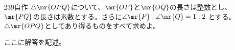 \begin{prob}{239}{}{自作}
 $\triangle\mr{OPQ}$について、$\mr{OP}$と$\mr{OQ}$の長さは整数とし、$\mr{PQ}$の長さは素数とする。さらに$\angle\mr{P}:\angle\mr{Q}=1:2$ とする。$\triangle\mr{OPQ}$としてあり得るものをすべて求めよ。
\end{prob}
ここに解答を記述。